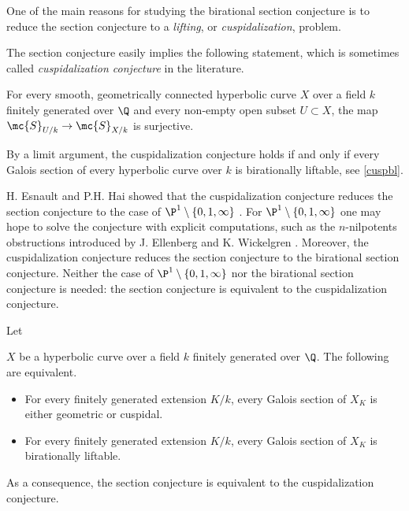 One of the main reasons for studying the birational section conjecture is to reduce the section conjecture to a \emph{lifting}, or \emph{cuspidalization}, problem.

The section conjecture easily implies the following statement, which is sometimes called \emph{cuspidalization conjecture} in the literature.

\begin{CC}
\notready
    For every smooth, geometrically connected hyperbolic curve $X$ over a field $k$ finitely generated over $\Q$ and every non-empty open subset $U\subset X$, the map $\mc{S}_{U/k}\to\mc{S}_{X/k}$ is surjective.
\end{CC}

By a limit argument, the cuspidalization conjecture holds if and only if every Galois section of every hyperbolic curve over $k$ is birationally liftable, see \autoref{cuspbl}.

H. Esnault and P.H. Hai showed that the cuspidalization conjecture reduces the section conjecture to the case of $\P^{1}\setminus\{0,1,\infty\}$ \cite[Proposition 7.9]{eh08}. For $\P^{1}\setminus\{0,1,\infty\}$ one may hope to solve the conjecture with explicit computations, such as the $n$-nilpotents obstructions introduced by J. Ellenberg and K. Wickelgren \cite{wic12}. Moreover, the cuspidalization conjecture reduces the section conjecture to the birational section conjecture. Neither the case of $\P^{1}\setminus\{0,1,\infty\}$ nor the birational section conjecture is needed: the section conjecture is equivalent to the cuspidalization conjecture.


\begin{TB}
\notready
	\hypertarget{TB}{Let} $X$ be a hyperbolic curve over a field $k$ finitely generated over $\Q$. The following are equivalent.
	\begin{itemize}
		\item For every finitely generated extension $K/k$, every Galois section of $X_{K}$ is either geometric or cuspidal.
		\item For every finitely generated extension $K/k$, every Galois section of $X_{K}$ is birationally liftable.
	\end{itemize}
        As a consequence, the section conjecture is equivalent to the cuspidalization conjecture.
\end{TB}



